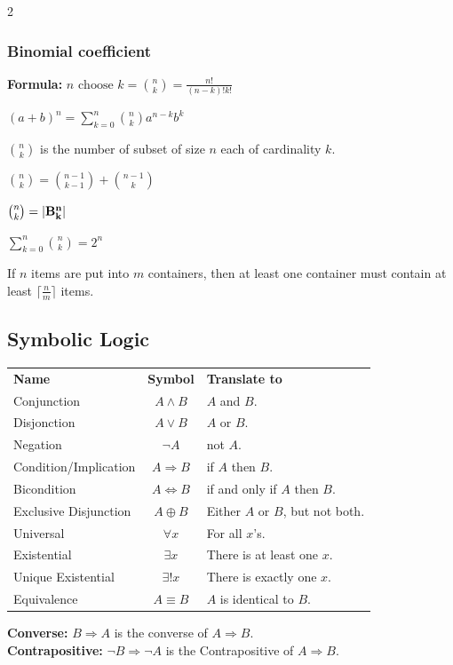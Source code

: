 \documentclass[5pt]{article}
\begin{document}
\begin{multicols}{2}
\subsubsection{Binomial coefficient}
\textbf{Formula:} $n \text{ choose } k=\binom{n}{k}=\frac{n!}{(n-k)!k!}$
\begin{theorem}
    $(a+b)^n=\sum^n_{k=0}\binom{n}{k}a^{n-k}b^k$
\end{theorem}
\begin{properties}
    \begin{itemize*}
        \item $\binom{n}{k}$ is the number of subset of size $n$ each of cardinality $k$.
        \item $\binom{n}{k}=\binom{n-1}{k-1}+\binom{n-1}{k}$
        \item $\binom{n}{k}=|\bf{B}^n_k|$
        \item $\sum_{k=0}^{n}\binom{n}{k}=2^n$
    \end{itemize*}
\end{properties}

\begin{theorem}
    If $n$ items are put into $m$ containers, then at least one container must contain at least $\lceil \frac{n}{m} \rceil$ items.
\end{theorem}

\subsection{Symbolic Logic}
\begin{tabular}{lcl}
    \textbf{Name}           & \textbf{Symbol}               & \textbf{Translate to}\\
    Conjunction             & $A\land B$                    & $A$ and $B$.\\
    Disjonction             & $A\lor B$                     & $A$ or $B$.\\
    Negation                & $\lnot A$                     & not $A$.\\
    Condition/Implication   & $A\Rightarrow B$              & if $A$ then $B$.\\
    Bicondition             & $A\Leftrightarrow B$          & if and only if $A$ then $B$.\\
    Exclusive Disjunction   & $A\oplus B$                   & Either $A$ or $B$, but not both.\\
    Universal               & $\forall x$                   & For all $x$'s.\\
    Existential             & $\exists x$                   & There is at least one $x$.\\
    Unique Existential      & $\exists! x$                  & There is exactly one $x$.\\
    Equivalence             & $A\equiv B$                   & $A$ is identical to $B$.\\
\end{tabular}
\textbf{Converse:} $B\Rightarrow A$ is the converse of $A\Rightarrow B$.\\
\textbf{Contrapositive:} $\lnot B\Rightarrow \lnot A$ is the Contrapositive of $A\Rightarrow B$. 


\end{multicols}
\end{document}

